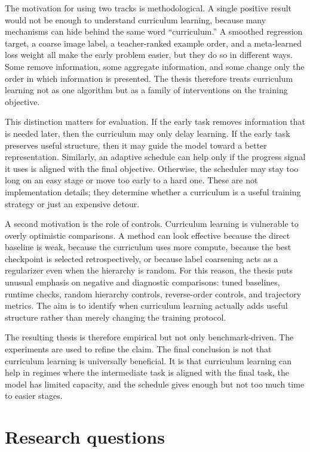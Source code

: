\documentclass[english,master,a4paper,oneside]{ppfcmthesis}
\begin{document}
The motivation for using two tracks is methodological. A single positive result
would not be enough to understand curriculum learning, because many mechanisms
can hide behind the same word ``curriculum.'' A smoothed regression target, a
coarse image label, a teacher-ranked example order, and a meta-learned loss
weight all make the early problem easier, but they do so in different ways. Some
remove information, some aggregate information, and some change only the order
in which information is presented. The thesis therefore treats curriculum
learning not as one algorithm but as a family of interventions on the training
objective.

This distinction matters for evaluation. If the early task removes information
that is needed later, then the curriculum may only delay learning. If the early
task preserves useful structure, then it may guide the model toward a better
representation. Similarly, an adaptive schedule can help only if the progress
signal it uses is aligned with the final objective. Otherwise, the scheduler may
stay too long on an easy stage or move too early to a hard one. These are not
implementation details; they determine whether a curriculum is a useful training
strategy or just an expensive detour.

A second motivation is the role of controls. Curriculum learning is vulnerable
to overly optimistic comparisons. A method can look effective because the direct
baseline is weak, because the curriculum uses more compute, because the best
checkpoint is selected retrospectively, or because label coarsening acts as a
regularizer even when the hierarchy is random. For this reason, the thesis puts
unusual emphasis on negative and diagnostic comparisons: tuned baselines,
runtime checks, random hierarchy controls, reverse-order controls, and
trajectory metrics. The aim is to identify when curriculum learning actually
adds useful structure rather than merely changing the training protocol.

The resulting thesis is therefore empirical but not only benchmark-driven. The
experiments are used to refine the claim. The final conclusion is not that
curriculum learning is universally beneficial. It is that curriculum learning can
help in regimes where the intermediate task is aligned with the final task, the
model has limited capacity, and the schedule gives enough but not too much time
to easier stages.

\section{Research questions}
\end{document}
